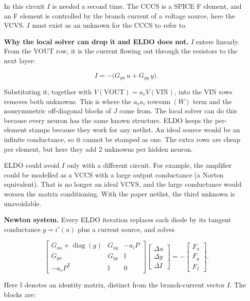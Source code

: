 \documentclass[11pt,a4paper]{article}
\begin{document}
In this circuit $I$ is needed a second time. The CCCS is a SPICE F element, and an F
element is controlled by the branch current of a voltage source, here the VCVS. $I$ must
exist as an unknown for the CCCS to refer to.

\textbf{Why the local solver can drop it and ELDO does not.} $I$ enters linearly. From
the VOUT row, it is the current flowing out through the resistors to the next layer:

\[
I = -\big(G_{yu}\,u + G_{yy}\,y\big).
\]

Substituting it, together with $V(\mathrm{VOUT})=a_vV(\mathrm{VIN})$, into the VIN rows
removes both unknowns. This is where the $a_va_i\operatorname{rowsum}(W)$ term and the
nonsymmetric off-diagonal blocks of $J$ come from. The local solver can do this because
every neuron has the same known structure. ELDO keeps the per-element stamps because
they work for any netlist. An ideal source would be an infinite conductance, so it
cannot be stamped as one. The extra rows are cheap per element, but here they add 2
unknowns per hidden neuron.

ELDO could avoid $I$ only with a different circuit. For example, the amplifier could be
modelled as a VCCS with a large output conductance (a Norton equivalent). That is no
longer an ideal VCVS, and the large conductance would worsen the matrix conditioning.
With the paper netlist, the third unknown is unavoidable.

\textbf{Newton system.} Every ELDO iteration replaces each diode by its tangent
conductance $g=i'(u)$ plus a current source, and solves

\[
\begin{bmatrix}
G_{uu} + \operatorname{diag}(g) & G_{uy} & -a_i P \\
G_{yu} & G_{yy} & \mathbb I \\
-a_v P^{\mathsf T} & \mathbb I & 0
\end{bmatrix}
\begin{bmatrix} \Delta u \\ \Delta y \\ \Delta I \end{bmatrix}
= -\begin{bmatrix} F_u \\ F_y \\ F_I \end{bmatrix}.
\]

Here $\mathbb I$ denotes an identity matrix, distinct from the branch-current vector $I$. The blocks are:
\end{document}
